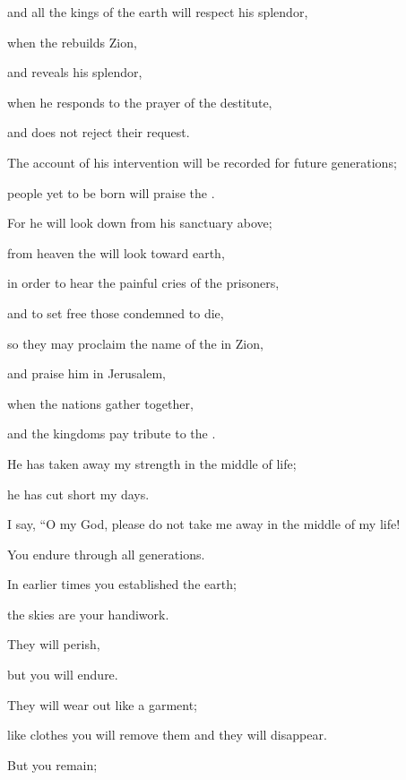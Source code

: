 {\par }{\Q and all
the kings
of the earth
will respect his splendor,
\par }{\Q {}when
the {}
rebuilds
Zion,
\par }{\Q and reveals
his splendor,
\par }{\Q {}when
he responds
to
the prayer
of the destitute,
\par }{\Q and does not
reject
their request.
\par }{\Q {}The account of his intervention will be recorded
for future generations;
\par }{\Q people
yet to be born
will praise
the
{}.
\par }{\Q {}For
he will look
down from his sanctuary
above;
\par }{\Q from heaven
the {}
will look
toward earth,
\par }{\Q {}in order to hear
the painful
cries of the prisoners,
\par }{\Q and to set free
those condemned to die,
\par }{\Q {}so they may proclaim
the name
of the {}
in Zion,
\par }{\Q and praise
him in Jerusalem,
\par }{\Q {}when the nations
gather
together,
\par }{\Q and the kingdoms
pay tribute
to the
{}.
\par }{\Q {}He has taken away
my strength
in the middle of life;

\par }{\Q he has cut short
my days.
\par }{\Q {}I say,
“O my God,
please do not
take me away in the middle
of my life!

\par }{\Q You endure through all generations.
\par }{\Q {}In earlier
times you established
the earth;
\par }{\Q the skies
are your handiwork.
\par }{\Q {}They
will perish,
\par }{\Q but you
will endure.
\par }{\Q They will wear out
like a garment;
\par }{\Q like clothes
you will remove
them and they will disappear.
\par }{\Q {}But you
remain;

}

